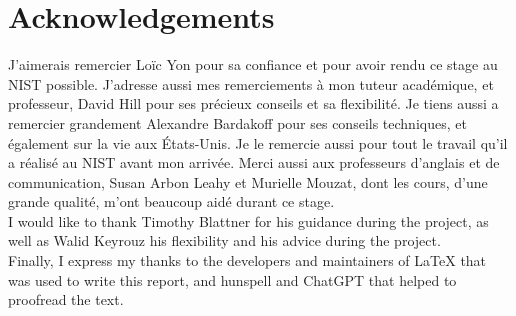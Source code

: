 
\clearpage{}
\pagestyle{empty}
\section*{Acknowledgements}

J'aimerais remercier Loïc Yon pour sa confiance et pour avoir rendu ce stage au
NIST possible. J'adresse aussi mes remerciements à mon tuteur académique, et
professeur, David Hill pour ses précieux conseils et sa flexibilité. Je tiens
aussi a remercier grandement Alexandre Bardakoff pour ses conseils techniques,
et également sur la vie aux États-Unis. Je le remercie aussi pour tout le
travail qu'il a réalisé au NIST avant mon arrivée. Merci aussi aux professeurs
d'anglais et de communication, Susan Arbon Leahy et Murielle Mouzat, dont les
cours, d'une grande qualité, m'ont beaucoup aidé durant ce stage.\\

I would like to thank Timothy Blattner for his guidance during the project, as
well as Walid Keyrouz his flexibility and his advice during the project.\\

Finally, I express my thanks to the developers and maintainers of \LaTeX{} that
was used to write this report, and hunspell and ChatGPT that helped to proofread
the text.

\clearpage{}
